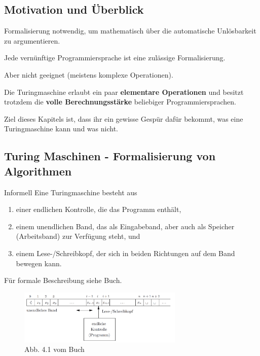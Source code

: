 \documentclass[a4paper, 11pt]{article}
\begin{document}
    
        \subsection{Motivation und Überblick}
        Formalisierung notwendig, um mathematisch über die automatische Unlösbarkeit zu argumentieren.
    
        Jede vernünftige Programmiersprache ist eine zulässige Formalisierung. 
    
        Aber nicht geeignet (meistens komplexe Operationen).
    
        Die Turingmaschine erlaubt ein paar \textbf{elementare Operationen} und besitzt trotzdem die \textbf{volle Berechnungsstärke} beliebiger Programmiersprachen.
    
        Ziel dieses Kapitels ist, dass ihr ein gewisse Gespür dafür bekommt, was eine Turingmaschine kann und was nicht.
    
    
    
        \subsection{Turing Maschinen - Formalisierung von Algorithmen}
        \begin{subbox}{Informell}
            Eine Turingmaschine besteht aus 
            \begin{enumerate}[label=(\roman*)]
                \item einer endlichen Kontrolle, die das Programm enthält,
                \item einem unendlichen Band, das als Eingabeband, aber auch als Speicher (Arbeitsband) zur Verfügung steht, und 
                \item einem Lese-/Schreibkopf, der sich in beiden Richtungen auf dem Band bewegen kann.
            \end{enumerate}
        \end{subbox}
        Für formale Beschreibung siehe Buch.
    
        \begin{figure}[htp]
            \centering
            \includegraphics[width=0.7\textwidth]{Turingmaschine.png}
            \caption{Abb. 4.1 vom Buch}
        \end{figure}
    
\end{document}
